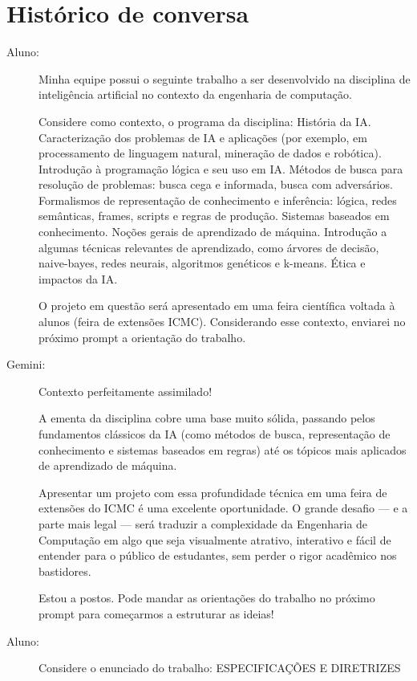 \section{Histórico de conversa}
\begin{description}
    \item[Aluno:] Minha equipe possui o seguinte trabalho a ser desenvolvido na disciplina de inteligência artificial no contexto da engenharia de computação.

    Considere como contexto, o programa da disciplina:
    História da IA. Caracterização dos problemas de IA e aplicações (por exemplo, em processamento de linguagem natural, mineração de dados e robótica). Introdução à programação lógica e seu uso em IA. Métodos de busca para resolução de problemas: busca cega e informada, busca com adversários. Formalismos de representação de conhecimento e inferência: lógica, redes semânticas, frames, scripts e regras de produção. Sistemas baseados em conhecimento. Noções gerais de aprendizado de máquina. Introdução a algumas técnicas relevantes de aprendizado, como árvores de decisão, naive-bayes, redes neurais, algoritmos genéticos e k-means. Ética e impactos da IA.

    O projeto em questão será apresentado em uma feira científica voltada à alunos (feira de extensões ICMC). Considerando esse contexto, enviarei no próximo prompt a orientação do trabalho.

    \item[Gemini:] Contexto perfeitamente assimilado!

    A ementa da disciplina cobre uma base muito sólida, passando pelos fundamentos clássicos da IA (como métodos de busca, representação de conhecimento e sistemas baseados em regras) até os tópicos mais aplicados de aprendizado de máquina.

    Apresentar um projeto com essa profundidade técnica em uma feira de extensões do ICMC é uma excelente oportunidade. O grande desafio — e a parte mais legal — será traduzir a complexidade da Engenharia de Computação em algo que seja visualmente atrativo, interativo e fácil de entender para o público de estudantes, sem perder o rigor acadêmico nos bastidores.

    Estou a postos. Pode mandar as orientações do trabalho no próximo prompt para começarmos a estruturar as ideias!

    \item[Aluno:] Considere o enunciado do trabalho:
    ESPECIFICAÇÕES E DIRETRIZES


\end{description}
